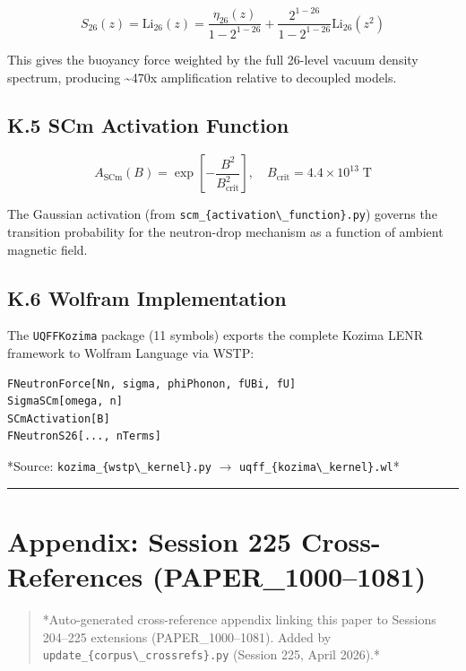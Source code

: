 \documentclass[11pt]{article}
\begin{document}
$$S_{26}(z) = \text{Li}_{26}(z) = \frac{\eta_{26}(z)}{1 - 2^{1-26}} + \frac{2^{1-26}}{1 - 2^{1-26}} \text{Li}_{26}(z^2)$$

This gives the buoyancy force weighted by the full 26-level vacuum density spectrum, producing \textasciitilde{}470x amplification relative to decoupled models.

\subsection*{K.5 SCm Activation Function}

$$A_{\mathrm{SCm}}(B) = \exp\!\left[-\frac{B^2}{B_{\mathrm{crit}}^2}\right], \quad B_{\mathrm{crit}} = 4.4 \times 10^{13} \;\text{T}$$

The Gaussian activation (from \verb|scm_{activation\_function}.py|) governs the transition probability for the neutron-drop mechanism as a function of ambient magnetic field.

\subsection*{K.6 Wolfram Implementation}

The \verb|UQFFKozima| package (11 symbols) exports the complete Kozima LENR framework to Wolfram Language via WSTP:

\begin{verbatim}
FNeutronForce[Nn, sigma, phiPhonon, fUBi, fU]
SigmaSCm[omega, n]
SCmActivation[B]
FNeutronS26[..., nTerms]
\end{verbatim}

*Source: \verb|kozima_{wstp\_kernel}.py| $\to$ \verb|uqff_{kozima\_kernel}.wl|*

\noindent\rule{\textwidth}{0.4pt}

\section*{Appendix: Session 225 Cross-References (PAPER\_1000--1081)}

\begin{quote}
*Auto-generated cross-reference appendix linking this paper to
Sessions 204--225 extensions (PAPER\_1000--1081). Added by
\verb|update_{corpus\_crossrefs}.py| (Session 225, April 2026).*
\end{quote}
\end{document}

